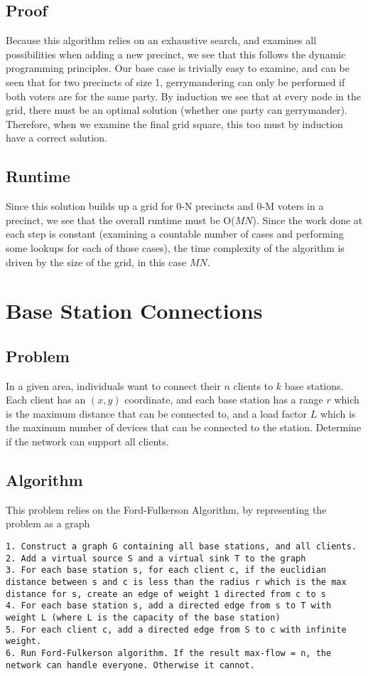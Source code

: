 \documentclass[titlepage]{article}
\begin{document}
\subsection{Proof}
Because this algorithm relies on an exhaustive search, and examines all possibilities when adding a new precinct, we see that this follows
the dynamic programming principles. Our base case is trivially easy to examine, and can be seen that for two precincts of size 1, gerrymandering can
only be performed if both voters are for the same party. By induction we see that at every node in the grid, there must be an optimal 
solution (whether one party can gerrymander). Therefore, when we examine the final grid square, this too must by induction have a correct 
solution. 
\subsection{Runtime}
Since this solution builds up a grid for 0-N precincts and 0-M voters in a precinct, we see that the overall runtime must be O($MN$). Since
the work done at each step is constant (examining a countable number of cases and performing some lookups for each of those cases), the
time complexity of the algorithm is driven by the size of the grid, in this case $MN$.

\section{Base Station Connections}
\subsection{Problem}
In a given area, individuals want to connect their $n$ clients to $k$ base stations. Each client has an $(x, y)$ coordinate, and each base station
has a range $r$ which is the maximum distance that can be connected to, and a load factor $L$ which is the maximum number of devices that
can be connected to the station. Determine if the network can support all clients.
\subsection{Algorithm}
This problem relies on the Ford-Fulkerson Algorithm, by representing the problem as a graph
\begin{lstlisting}
1. Construct a graph G containing all base stations, and all clients.
2. Add a virtual source S and a virtual sink T to the graph
3. For each base station s, for each client c, if the euclidian distance between s and c is less than the radius r which is the max distance for s, create an edge of weight 1 directed from c to s
4. For each base station s, add a directed edge from s to T with weight L (where L is the capacity of the base station)
5. For each client c, add a directed edge from S to c with infinite weight.
6. Run Ford-Fulkerson algorithm. If the result max-flow = n, the network can handle everyone. Otherwise it cannot.
\end{lstlisting}
\end{document}
